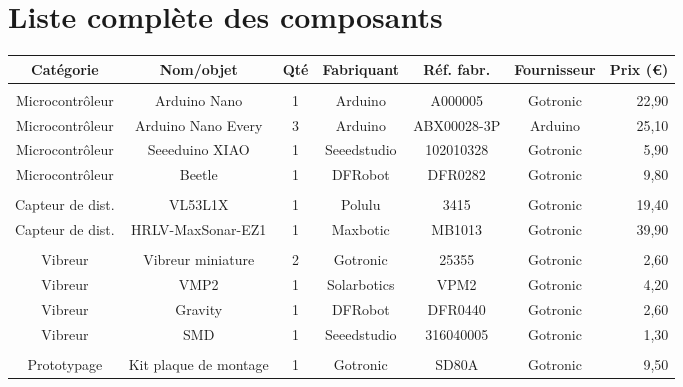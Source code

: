 \documentclass[a4paper, 11pt]{article}
\begin{document}
\section{Liste complète des composants}
\begin{table}[h!]
\centering
\begin{scriptsize}
\begin{tabular}{ccccccr}
\hline
{\bf Catégorie} & {\bf Nom/objet} & {\bf Qté} & {\bf Fabriquant} & {\bf Réf. fabr.} & {\bf Fournisseur} & {\bf Prix (€)} \\
\hline
 & & & & & & \\
Microcontrôleur & Arduino Nano & 1 & Arduino & A000005 & Gotronic & 22,90 \\
Microcontrôleur & Arduino Nano Every & 3 & Arduino & ABX00028-3P & Arduino & 25,10 \\
Microcontrôleur & Seeeduino XIAO & 1 & Seeedstudio & 102010328 & Gotronic & 5,90 \\
Microcontrôleur & Beetle & 1 & DFRobot & DFR0282 & Gotronic & 9,80 \\
 & & & & & & \\
Capteur de dist. & VL53L1X & 1 & Polulu & 3415 & Gotronic & 19,40 \\
Capteur de dist. & HRLV-MaxSonar-EZ1 & 1 & Maxbotic & MB1013 & Gotronic & 39,90 \\
 & & & & & & \\
Vibreur & Vibreur miniature & 2 & Gotronic & 25355 & Gotronic & 2,60 \\
Vibreur & VMP2 & 1 & Solarbotics & VPM2 & Gotronic & 4,20 \\
Vibreur & Gravity & 1 & DFRobot & DFR0440 & Gotronic & 2,60 \\
Vibreur & SMD & 1 & Seeedstudio & 316040005 & Gotronic & 1,30 \\
 & & & & & & \\
Prototypage & Kit plaque de montage & 1 & Gotronic & SD80A & Gotronic & 9,50 \\

\end{tabular}
\end{scriptsize}
\end{table}
\end{document}
